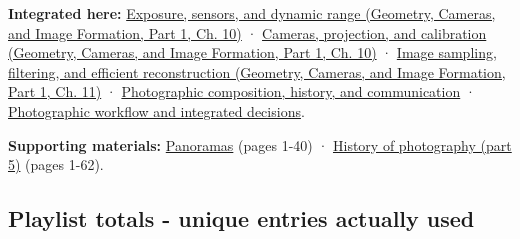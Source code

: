 \textbf{Integrated here:} \href{../03-Geometry-Cameras-and-Image-Formation-P01/main.pdf\#03-visual-computing-i-ch003-exposure-sensors-and-dynamic-range}{Exposure, sensors, and dynamic range (Geometry, Cameras, and Image Formation, Part 1, Ch. 10)} · \href{../03-Geometry-Cameras-and-Image-Formation-P01/main.pdf\#03-visual-computing-i-ch003-cameras-projection-and-calibration}{Cameras, projection, and calibration (Geometry, Cameras, and Image Formation, Part 1, Ch. 10)} · \href{../03-Geometry-Cameras-and-Image-Formation-P01/main.pdf\#03-visual-computing-i-ch004-image-sampling-filtering-and-efficient-reconstruction}{Image sampling, filtering, and efficient reconstruction (Geometry, Cameras, and Image Formation, Part 1, Ch. 11)} · \hyperref[04-visual-computing-ii-ch034-photographic-composition-history-and-communication]{Photographic composition, history, and communication} · \hyperref[04-visual-computing-ii-ch034-photographic-workflow-and-integrated-decisions]{Photographic workflow and integrated decisions}.

\textbf{Supporting materials:} \href{https://drive.google.com/open?id=0B6w2XfPHEcZYYVNCbmdFRUI1Zjg}{Panoramas} (pages 1-40) · \href{https://drive.google.com/open?id=0B6w2XfPHEcZYMU1OLTI2QUZQa1E}{History of photography (part 5)} (pages 1-62).

\subsection{Playlist totals - unique entries actually used}\label{04-visual-computing-ii-ch036-playlist-totals---unique-entries-actually-used}

\hypertarget{04-visual-computing-ii-ch036-playlist-totals---unique-entries-actually-used}{}

